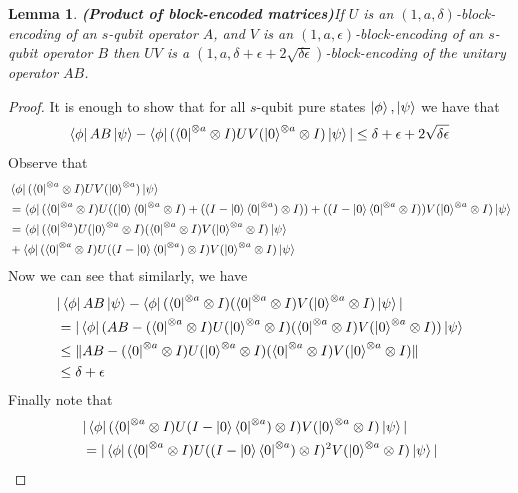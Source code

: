 \documentclass[12pt, oneside]{book}
\newtheorem{lemma}[theorem]{Lemma}
\theoremstyle{definition}
\theoremstyle{definition}
\theoremstyle{remark}
\begin{document}
\begin{lemma}
    \textbf{(Product of block-encoded matrices)}If $U$ is an $(1,a,\delta)$-block-encoding of an $s$-qubit operator $A$, and $V$ is an $(1,a,\epsilon)$-block-encoding of an $s$-qubit operator $B$ then $UV$ is a $(1,a,\delta+\epsilon+2\sqrt{\delta\epsilon})$-block-encoding of the unitary operator $AB$.
\end{lemma}
\begin{proof}
    It is enough to show that for all $s$-qubit pure states $\ket{\phi},\ket{\psi}$ we have that 
    \[
    \bra{\phi}AB\ket{\psi}-\bra{\phi}(\bra{0}^{\otimes a}\otimes I)UV(\ket{0}^{\otimes a}\otimes I)\ket{\psi}|\leq \delta+\epsilon+2\sqrt{\delta\epsilon}
    \]
    Observe that
    \begin{align*}
        &\bra{\phi}(\bra{0}^{\otimes a}\otimes I)UV(\ket{0}^{\otimes a})\ket{\psi}\\
        &=\bra{\phi}(\bra{0}^{\otimes a}\otimes I)U((\ket{0}\bra{0}^{\otimes a}\otimes I)+((I-\ket{0}\bra{0}^{\otimes a})\otimes I))+((I-\ket{0}\bra{0}^{\otimes a}\otimes I))V(\ket{0}^{\otimes a}\otimes I)\ket{\psi}\\
        &=\bra{\phi}(\bra{0}^{\otimes a})U(\ket{0}^{\otimes a}\otimes I)(\bra{0}^{\otimes a}\otimes I)V(\ket{0}^{\otimes a}\otimes I)\ket{\psi}\\
        &+\bra{\phi}(\bra{0}^{\otimes a}\otimes I)U((I-\ket{0}\bra{0}^{\otimes a})\otimes I)V(\ket{0}^{\otimes a}\otimes I)\ket{\psi}
    \end{align*}
    Now we can see that similarly, we have
    \begin{align*}
        &|\bra{\phi}AB\ket{\psi}-\bra{\phi}(\bra{0}^{\otimes a}\otimes I)(\bra{0}^{\otimes a}\otimes I)V(\ket{0}^{\otimes a}\otimes I)\ket{\psi}|\\
        &=|\bra{\phi}(AB-(\bra{0}^{\otimes a}\otimes I)U(\ket{0}^{\otimes a}\otimes I)(\bra{0}^{\otimes a}\otimes I)V(\ket{0}^{\otimes a}\otimes I))\ket{\psi}\\
        &\leq \|AB-(\bra{0}^{\otimes a}\otimes I)U(\ket{0}^{\otimes a}\otimes I)(\bra{0}^{\otimes a}\otimes I)V(\ket{0}^{\otimes a}\otimes I)\|\\
        &\leq \delta +\epsilon
    \end{align*}
    Finally note that
    \begin{align*}
    &|\bra{\phi}(\bra{0}^{\otimes a}\otimes I)U(I-\ket{0}\bra{0}^{\otimes a})\otimes I)V(\ket{0}^{\otimes a}\otimes I)\ket{\psi}|\\
    &=|\bra{\phi}(\bra{0}^{\otimes a}\otimes I)U((I-\ket{0}\bra{0}^{\otimes a})\otimes I)^2V(\ket{0}^{\otimes a}\otimes I)\ket{\psi}|\\

\end{align*}
\end{proof}
\end{document}
